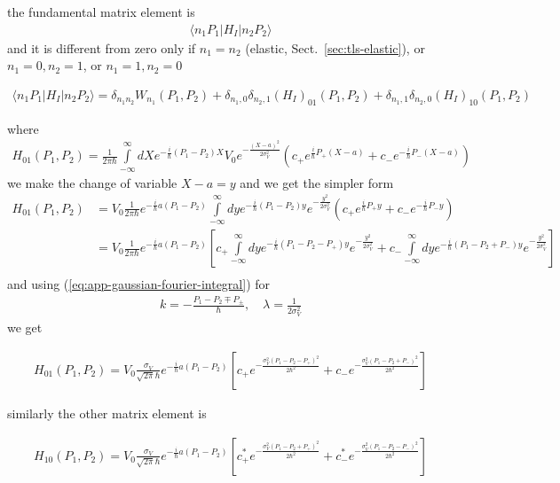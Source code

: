 the fundamental matrix element is
\begin{align}
    \langle n_1 P_1|H_I|n_2 P_2\rangle
\end{align}
and it is different from zero only if $n_1=n_2$ (elastic, Sect.~\ref{sec:tls-elastic}), or $n_1=0,n_2=1$, or $n_1=1,n_2=0$
\begin{importantbox}
    \begin{align}
        \langle n_1 P_1|H_I|n_2 P_2\rangle =\delta_{n_1n_2}W_{n_1}(P_1,P_2)+\delta_{n_1,0}\delta_{n_2,1}(H_I)_{01}(P_1,P_2)+\delta_{n_1,1}\delta_{n_2,0}(H_I)_{10}(P_1,P_2)\label{eq:tls-full-matrix-element}
    \end{align}
\end{importantbox}
where
\begin{align}
    H_{01}(P_1,P_2)=\frac1{2\pi\hbar}\int\limits_{-\infty}^{\infty}dX e^{-\frac{i}{\hbar}(P_1-P_2)X}V_0 e^{-\frac{(X-a)^2}{2\sigma_V^2}}\left(c_{+} e^{\frac{i}\hbar {P_{+}}(X-a)}+c_{-} e^{-\frac{i}\hbar P_{{-}}(X-a)}\right)
\end{align}
we make the change of variable $X-a=y$ and we get the simpler form
\begin{align}
    H_{01}(P_1,P_2)&=V_0\frac{1}{2\pi\hbar}e^{-\frac{i}{\hbar}a(P_1-P_2)}\int\limits_{-\infty}^{\infty}dy e^{-\frac{i}{\hbar}(P_1-P_2)y} e^{-\frac{y^2}{2\sigma_V^2}}\left(c_{+} e^{\frac{i}\hbar {P_{+}}y}+c_{-} e^{-\frac{i}\hbar P_{{-}}y}\right)\nonumber\\
    &=V_0\frac{1}{2\pi\hbar}e^{-\frac{i}{\hbar}a(P_1-P_2)}\left[c_{+} \int\limits_{-\infty}^{\infty}dy e^{-\frac{i}{\hbar}(P_1-P_2-P_+)y} e^{-\frac{y^2}{2\sigma_V^2}}+c_{-} \int\limits_{-\infty}^{\infty}dy e^{-\frac{i}{\hbar}(P_1-P_2+P_-)y} e^{-\frac{y^2}{2\sigma_V^2}}\right]\nonumber\\
\end{align}
and using (\ref{eq:app-gaussian-fourier-integral}) for
\begin{align}
    k=-\frac{P_1-P_2\mp P_{\pm}}{\hbar},\quad \lambda=\frac1{2\sigma_V^2}
\end{align}
we get
\begin{importantbox}
    \begin{align}
        H_{01}(P_1,P_2) = V_0\frac{\sigma_V}{\sqrt{2\pi}\hbar}e^{-\frac{i}{\hbar}a(P_1-P_2)}\left[c_+e^{-\frac{\sigma_V^2(P_1-P_2-P_+)^2}{2\hbar^2}}+c_-e^{-\frac{\sigma_V^2(P_1-P_2+P_-)^2}{2\hbar^2}}\right]\label{eq:tls-H01}
    \end{align}
\end{importantbox}
similarly the other matrix element is
\begin{importantbox}
    \begin{align}
        H_{10}(P_1,P_2) = V_0\frac{\sigma_V}{\sqrt{2\pi}\hbar}e^{-\frac{i}{\hbar}a(P_1-P_2)}\left[c_+^*e^{-\frac{\sigma_V^2(P_1-P_2+P_+)^2}{2\hbar^2}}+c_-^*e^{-\frac{\sigma_V^2(P_1-P_2-P_-)^2}{2\hbar^2}}\right]\label{eq:tls-H10}
    \end{align}
\end{importantbox}

